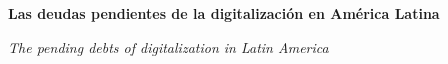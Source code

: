 
\renewcommand{\articuloidiomaxml}{es}
\renewcommand{\articulotitulo}{Las deudas pendientes de la digitalización en América Latina}
\renewcommand{\articuloautores}{Lucas Samyn, Ruth Alonso Cabral}
\renewcommand{\articulodoi}{10.18356/9789210029582c005}
\renewcommand{\articulotipo}{EDITORIAL}
\renewcommand{\articulorevista}{Blensera}
\renewcommand{\articuloissne}{2697-3650}
\renewcommand{\articulovolumen}{01}
\renewcommand{\articulonumero}{01}
\renewcommand{\articulofecha}{ 2026}
\renewcommand{\articulopagina}{1}

\setcounter{page}{1}
\thispagestyle{firstpage}

\noindent\begin{minipage}[t]{\dimexpr\textwidth+\marginparsep+\marginparwidth\relax}%
{\sffamily\bfseries\Large\articulotitulo\par}%
\end{minipage}\par
\vspace{3mm}%
\renewcommand{\articulotitulotrans}{The pending debts of digitalization in Latin America}
\noindent\begin{minipage}[t]{\dimexpr\textwidth+\marginparsep+\marginparwidth\relax}%
{\sffamily\itshape\normalsize\articulotitulotrans\par}%
\end{minipage}\par
\vspace{4mm}%

